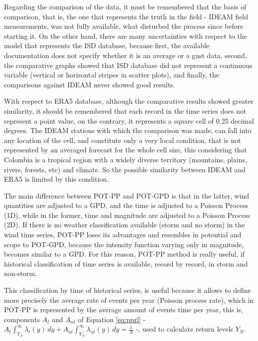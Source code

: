 \documentclass[12pt,oneside]{reedthesis}
\begin{document}
Regarding the comparison of the data, it must be remembered that the basis of comparison, that is, the one that represents the truth in the field - IDEAM field measurements, was not fully available, what disturbed the process since before starting it. On the other hand, there are many uncertainties with respect to the model that represents the ISD database, because first, the available documentation does not specify whether it is an average or a gust data, second, the comparative graphs showed that ISD database did not represent a continuous variable (vertical or horizontal stripes in scatter plots), and finally, the comparisons against IDEAM never showed good results.

With respect to ERA5 database, although the comparative results showed greater similarity, it should be remembered that each record in the time series does not represent a point value, on the contrary, it represents a square cell of 0.25 decimal degrees. The IDEAM stations with which the comparison was made, can fall into any location of the cell, and constitute only a very local condition, that is not represented by an averaged forecast for the whole cell size, this considering that Colombia is a tropical region with a widely diverse territory (mountains, plains, rivers, forests, etc) and climate. So the possible similarity between IDEAM and ERA5 is limited by this condition.

The main difference between POT-PP and POT-GPD is that in the latter, wind quantities are adjusted to a GPD, and the time is adjusted to a Poisson Process (1D), while in the former, time and magnitude are adjusted to a Poisson Process (2D). If there is no weather classification available (storm and no storm) in the wind time series, POT-PP loses its advantages and resembles in potential and scope to POT-GPD, because the intensity function varying only in magnitude, becomes similar to a GPD. For this reason, POT-PP method is really useful, if historical classification of time series is available, record by record, in storm and non-storm.

This classification by time of historical series, is useful because it allows to define more precisely the average rate of events per year (Poisson process rate), which in POT-PP is represented by the average amount of events time per year, this is, components \(A_t\) and \(A_{nt}\) of Equation \eqref{eq:pprl} - \(A_t\int_{Y_N}^{\infty}\lambda_t\left( y\right)\,dy + A_{nt}\int_{Y_N}^{\infty}\lambda_{nt}\left( y\right)\,dy = \frac{1}{N}\) -, used to calculate return levels \(Y_N\).
\end{document}
